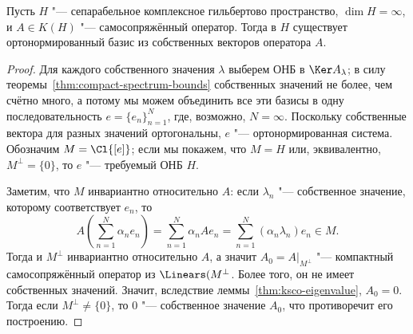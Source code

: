 \documentclass[main]{subfiles}
\begin{document}
\begin{theorem}
  Пусть \( H \) "--- сепарабельное комплексное гильбертово пространство,
  \( \dim H = \infty \), и
  \( A \in K(H) \) "--- самосопряжённый оператор.
  Тогда в \( H \) существует ортонормированный базис
  из собственных векторов оператора \( A \).
\end{theorem}
\begin{proof}
  Для каждого собственного значения \( \lambda \)
  выберем ОНБ в \( \Ker A_\lambda \);
  в силу теоремы~\ref{thm:compact-spectrum-bounds}
  собственных значений не более, чем счётно много,
  а потому мы можем объединить все эти базисы
  в одну последовательность \( e = \{ e_n \}_{n=1}^N \),
  где, возможно, \( N = \infty \).
  Поскольку собственные вектора для разных значений
  ортогональны, \( e \) "--- ортонормированная система.
  Обозначим \( M = \Cl{[e]} \);
  если мы покажем, что \( M = H \) или,
  эквивалентно, \( M^\perp = \{ 0 \} \),
  то \( e \) "--- требуемый ОНБ \( H \).

  Заметим, что \( M \) инвариантно относительно \( A \):
  если \( \lambda_n \) "--- собственное значение,
  которому соответствует \( e_n \), то
  \[
    A (\sum_{n=1}^N \alpha_n e_n) =
    \sum_{n=1}^N \alpha_n A e_n =
    \sum_{n=1}^N (\alpha_n \lambda_n) e_n \in M.
  \]
  Тогда и \( M^\perp \) инвариантно относительно \( A \),
  а значит \( A_0 = A \bigr|_{M^\perp} \) "---
  компактный самосопряжённый оператор из \( \Linears(M^\perp \).
  Более того, он не имеет собственных значений.
  Значит, вследствие леммы~\ref{thm:ksco-eigenvalue},
  \( A_0 = 0 \).
  Тогда если \( M^\perp \ne \{ 0 \} \), то \( 0 \) "---
  собственное значение \( A_0 \),
  что противоречит его построению.
\end{proof}
\end{document}
